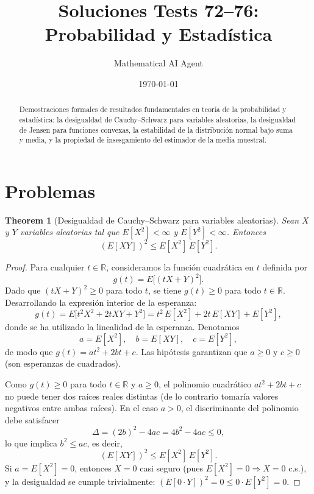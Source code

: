 \documentclass[11pt,a4paper]{article}
\title{Soluciones Tests 72--76: Probabilidad y Estadística}
\author{Mathematical AI Agent}
\date{\today}
\theoremstyle{plain}
\newtheorem{theorem}{Theorem}[section]
\theoremstyle{definition}
\theoremstyle{remark}
\begin{document}
\maketitle

\begin{abstract}
Demostraciones formales de resultados fundamentales en teoría de la probabilidad y estadística: la desigualdad de Cauchy--Schwarz para variables aleatorias, la desigualdad de Jensen para funciones convexas, la estabilidad de la distribución normal bajo suma y media, y la propiedad de insesgamiento del estimador de la media muestral.
\end{abstract}

\section{Problemas}


\begin{theorem}[Desigualdad de Cauchy--Schwarz para variables aleatorias]
Sean $X$ y $Y$ variables aleatorias tal que $E[X^2] < \infty$ y $E[Y^2] < \infty$. Entonces
\[
(E[XY])^2 \leq E[X^2]\,E[Y^2].
\]
\end{theorem}

\begin{proof}
Para cualquier $t \in \mathbb{R}$, consideramos la función cuadrática en $t$ definida por
\[
g(t) = E\bigl[(tX + Y)^2\bigr].
\]
Dado que $(tX + Y)^2 \geq 0$ para todo $t$, se tiene $g(t) \geq 0$ para todo $t \in \mathbb{R}$. Desarrollando la expresión interior de la esperanza:
\[
g(t) = E\bigl[t^2 X^2 + 2tXY + Y^2\bigr] = t^2\,E[X^2] + 2t\,E[XY] + E[Y^2],
\]
donde se ha utilizado la linealidad de la esperanza. Denotamos
\[
a = E[X^2], \quad b = E[XY], \quad c = E[Y^2],
\]
de modo que $g(t) = at^2 + 2bt + c$. Las hipótesis garantizan que $a \geq 0$ y $c \geq 0$ (son esperanzas de cuadrados).

Como $g(t) \geq 0$ para todo $t \in \mathbb{R}$ y $a \geq 0$, el polinomio cuadrático $at^2 + 2bt + c$ no puede tener dos raíces reales distintas (de lo contrario tomaría valores negativos entre ambas raíces). En el caso $a > 0$, el discriminante del polinomio debe satisfacer
\[
\Delta = (2b)^2 - 4ac = 4b^2 - 4ac \leq 0,
\]
lo que implica $b^2 \leq ac$, es decir,
\[
(E[XY])^2 \leq E[X^2]\,E[Y^2].
\]
Si $a = E[X^2] = 0$, entonces $X = 0$ casi seguro (pues $E[X^2] = 0 \Rightarrow X = 0$ c.s.), y la desigualdad se cumple trivialmente: $(E[0 \cdot Y])^2 = 0 \leq 0 \cdot E[Y^2] = 0$.
\end{proof}
\end{document}
